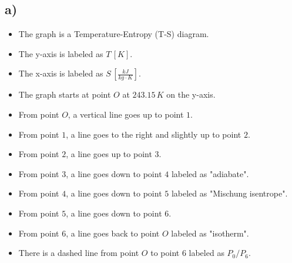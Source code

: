 

\subsection*{a)}

\begin{itemize}
    \item The graph is a Temperature-Entropy (T-S) diagram.
    \item The y-axis is labeled as $T \, [K]$.
    \item The x-axis is labeled as $S \, [\frac{kJ}{kg \cdot K}]$.
    \item The graph starts at point $O$ at $243.15 \, K$ on the y-axis.
    \item From point $O$, a vertical line goes up to point $1$.
    \item From point $1$, a line goes to the right and slightly up to point $2$.
    \item From point $2$, a line goes up to point $3$.
    \item From point $3$, a line goes down to point $4$ labeled as "adiabate".
    \item From point $4$, a line goes down to point $5$ labeled as "Mischung isentrope".
    \item From point $5$, a line goes down to point $6$.
    \item From point $6$, a line goes back to point $O$ labeled as "isotherm".
    \item There is a dashed line from point $O$ to point $6$ labeled as $P_0/P_6$.
\end{itemize}